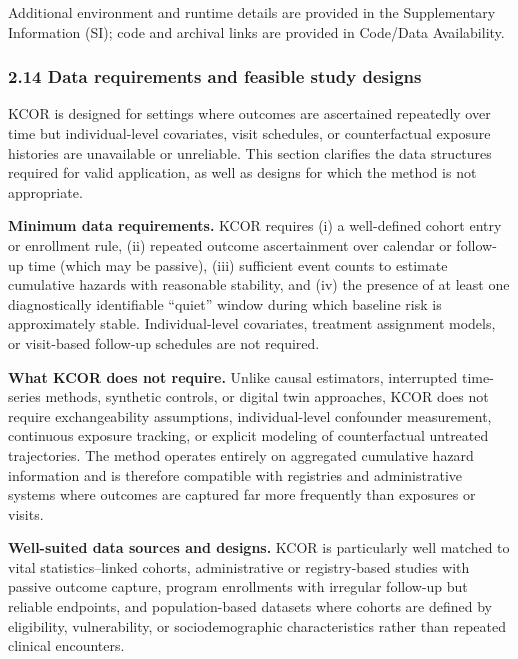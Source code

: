 \documentclass[
]{article}
\begin{document}
Additional environment and runtime details are provided in the Supplementary Information (SI); code and archival links are provided in Code/Data Availability.

\subsubsection{2.14 Data requirements and feasible study designs}\label{data-requirements-and-feasible-study-designs}

KCOR is designed for settings where outcomes are ascertained repeatedly over time but individual-level covariates, visit schedules, or counterfactual exposure histories are unavailable or unreliable. This section clarifies the data structures required for valid application, as well as designs for which the method is not appropriate.

\textbf{Minimum data requirements.} KCOR requires (i) a well-defined cohort entry or enrollment rule, (ii) repeated outcome ascertainment over calendar or follow-up time (which may be passive), (iii) sufficient event counts to estimate cumulative hazards with reasonable stability, and (iv) the presence of at least one diagnostically identifiable ``quiet'' window during which baseline risk is approximately stable. Individual-level covariates, treatment assignment models, or visit-based follow-up schedules are not required.

\textbf{What KCOR does not require.} Unlike causal estimators, interrupted time-series methods, synthetic controls, or digital twin approaches, KCOR does not require exchangeability assumptions, individual-level confounder measurement, continuous exposure tracking, or explicit modeling of counterfactual untreated trajectories. The method operates entirely on aggregated cumulative hazard information and is therefore compatible with registries and administrative systems where outcomes are captured far more frequently than exposures or visits.

\textbf{Well-suited data sources and designs.} KCOR is particularly well matched to vital statistics--linked cohorts, administrative or registry-based studies with passive outcome capture, program enrollments with irregular follow-up but reliable endpoints, and population-based datasets where cohorts are defined by eligibility, vulnerability, or sociodemographic characteristics rather than repeated clinical encounters.
\end{document}
